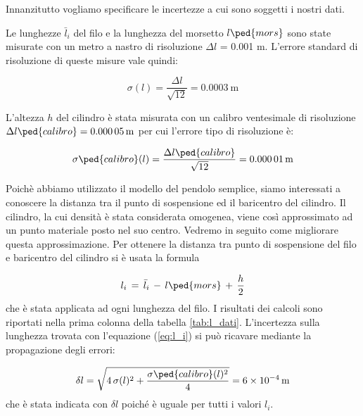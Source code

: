 \label{l_medie}

Innanzitutto vogliamo specificare le incertezze a cui sono soggetti i nostri dati.

Le lunghezze $\bar{l}_i$ del filo e la lunghezza del morsetto $l\ped{mors}$ sono state misurate con un metro a nastro di risoluzione
$\Delta l$ = 0.001 m. L'errore standard di risoluzione di queste misure vale quindi:

\begin{equation}
    \sigma(l) = \frac{\Delta l}{\sqrt{12}} = \SI{0.0003}{\metre}
\end{equation}

L'altezza $h$ del cilindro è stata misurata con un calibro ventesimale di risoluzione $\Delta l\ped{calibro} = \SI{0.00005}{\meter}$
per cui l'errore tipo di risoluzione è:

\begin{equation}
    \sigma\ped{calibro}(l) = \frac{\Delta l\ped{calibro}}{\sqrt{12}} = \SI{0.00001}{\metre}
\end{equation}

Poichè abbiamo utilizzato il modello del pendolo semplice, siamo interessati a conoscere la distanza tra il punto
di sospensione ed il baricentro del cilindro. Il cilindro, la cui densità è stata considerata omogenea,
viene così approssimato ad un punto materiale posto nel suo centro. Vedremo in seguito come migliorare questa approssimazione.
Per ottenere la distanza tra punto di sospensione del filo e baricentro del cilindro si è usata la formula

\begin{equation}
	l_i \,=\, \bar{l}_i \,-\, l\ped{mors} \,+\, \frac{h}{2}
    \label{eq:l_i}
\end{equation}
%
che è stata applicata ad ogni lunghezza del filo. I risultati dei calcoli sono riportati nella prima colonna
della tabella \ref{tab:l_dati}. L'incertezza sulla lunghezza trovata con l'equazione (\ref{eq:l_i}) si può ricavare mediante la propagazione
degli errori:

\begin{equation}
	\delta l = \sqrt{4\,\sigma(l)^2 + \frac{\sigma\ped{calibro}(l)^2}{4}} = \SI{6e-4}{m}
\end{equation}
%
che è stata indicata con $\delta l$ poiché è uguale per tutti i valori $l_i$.

